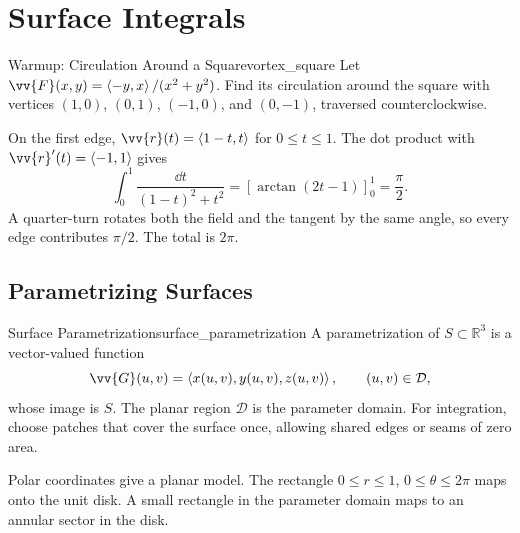 \section{Surface Integrals}

\begin{problem}{Warmup: Circulation Around a Square}{vortex_square}
Let $\vv{F}(x,y) = \ang{-y,x}/(x^2 + y^2)$. Find its circulation around the square with vertices $(1,0)$, $(0,1)$, $(-1,0)$, and $(0,-1)$, traversed counterclockwise.
\end{problem}
\begin{sol}
On the first edge, $\vv{r}(t) = \ang{1 - t,t}$ for $0 \le t \le 1$. The dot product with $\vv{r}'(t) = \ang{-1,1}$ gives
\[
    \int_0^1 \frac{\dd{t}}{(1 - t)^2 + t^2}
    = \left[\arctan(2t - 1)\right]_0^1 = \frac{\pi}{2}.
\]
A quarter-turn rotates both the field and the tangent by the same angle, so every edge contributes $\pi/2$. The total is $\boxed{2\pi}$.
\end{sol}

\subsection{Parametrizing Surfaces}
\begin{definition}{Surface Parametrization}{surface_parametrization}
A parametrization of $S \subset \mathbb{R}^3$ is a vector-valued function
\[
    \vv{G}(u,v) = \ang{x(u,v),y(u,v),z(u,v)},\qquad (u,v) \in \mathcal{D},
\]
whose image is $S$. The planar region $\mathcal{D}$ is the parameter domain. For integration, choose patches that cover the surface once, allowing shared edges or seams of zero area.
\end{definition}

Polar coordinates give a planar model. The rectangle $0 \le r \le 1$, $0 \le \theta \le 2\pi$ maps onto the unit disk. A small rectangle in the parameter domain maps to an annular sector in the disk.

